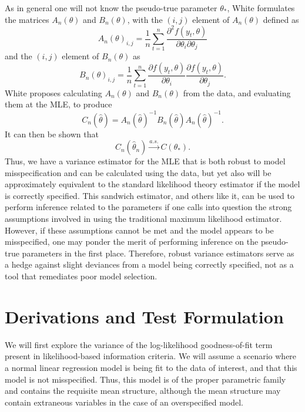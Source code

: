 \documentclass[submit]{smj}
\begin{document}
		As in general one will not know the pseudo-true parameter $\theta_*$, White formulates the matrices $A_n(\theta)$ and $B_n(\theta)$, with the $(i,j)$ element of $A_n(\theta)$ defined as
		\begin{equation*}
			A_n(\theta)_{i,j} = \frac{1}{n} \sum_{t=1}^{n} \frac{\partial^2 f(y_t,\theta)}{\partial \theta_i \partial \theta_j}
		\end{equation*}
		and the $(i,j)$ element of $B_n(\theta)$ as
		\begin{equation*}
			B_n(\theta)_{i,j} = \frac{1}{n} \sum_{t=1}^{n} \frac{\partial f(y_t,\theta)}{\partial \theta_i} \frac{\partial f(y_t,\theta)}{\partial \theta_j} .
		\end{equation*}
		White proposes calculating $A_n(\theta)$ and $B_n(\theta)$ from the data, and evaluating them at the MLE, to produce
		\begin{equation*}
			C_n(\hat{\theta}) = A_n(\hat{\theta})^{-1} B_n(\hat{\theta}) A_n(\hat{\theta})^{-1} .
		\end{equation*}
		It can then be shown that 
		\begin{equation*}
			C_n(\hat{\theta}_n) \xrightarrow[]{a.s.} C(\theta_* ) .
		\end{equation*}
		Thus, we have a variance estimator for the MLE that is both robust to model misspecification and can be calculated using the data, but yet also will be approximately equivalent to the standard
		likelihood theory estimator if the model is correctly specified. This sandwich estimator, and others like it, can be used to perform inference related to the parameters if one calls into question
		the strong assumptions involved in using the traditional maximum likelihood estimator. However, if these assumptions cannot be met and the model appears to be misspecified, one may ponder
		the merit of performing inference on the pseudo-true parameters in the first place. Therefore, robust variance estimators serve as a hedge against slight deviances from a model
		being correctly specified, not as a tool that remediates poor model selection.

\section{Derivations and Test Formulation}
		
		We will first explore the variance of the log-likelihood goodness-of-fit term present in likelihood-based information criteria. We will assume a
		scenario where a normal linear regression model is being fit to the data of interest, and that this model is not misspecified. Thus, this model is of the proper
		parametric family and contains the requisite mean structure, although the mean structure may contain extraneous variables in the
		case of an overspecified model.
\end{document}
